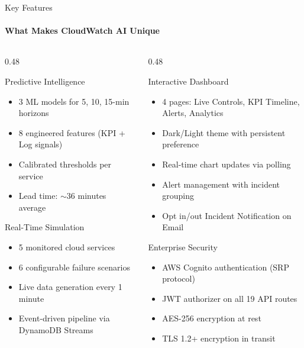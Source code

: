 \documentclass[aspectratio=169,11pt]{beamer}
\begin{document}
\begin{frame}[shrink=5]{Key Features}
\framesubtitle{What Makes CloudWatch AI Unique}

\begin{columns}[T]
\begin{column}{0.48\textwidth}
\begin{block}{Predictive Intelligence}
\begin{itemize}
    \item 3 ML models for 5, 10, 15-min horizons
    \item 8 engineered features (KPI + Log signals)
    \item Calibrated thresholds per service
    \item Lead time: $\sim$36 minutes average
\end{itemize}
\end{block}

\vspace{0.3em}
\begin{block}{Real-Time Simulation}
\begin{itemize}
    \item 5 monitored cloud services
    \item 6 configurable failure scenarios
    \item Live data generation every 1 minute
    \item Event-driven pipeline via DynamoDB Streams
\end{itemize}
\end{block}
\end{column}

\begin{column}{0.48\textwidth}
\begin{block}{Interactive Dashboard}
\begin{itemize}
    \item 4 pages: Live Controls, KPI Timeline, Alerts, Analytics
    \item Dark/Light theme with persistent preference
    \item Real-time chart updates via polling
    \item Alert management with incident grouping
    \item Opt in/out Incident Notification on Email
\end{itemize}
\end{block}

\vspace{0.3em}
\begin{block}{Enterprise Security}
\begin{itemize}
    \item AWS Cognito authentication (SRP protocol)
    \item JWT authorizer on all 19 API routes
    \item AES-256 encryption at rest
    \item TLS 1.2+ encryption in transit
\end{itemize}
\end{block}
\end{column}
\end{columns}
\end{frame}
\end{document}
